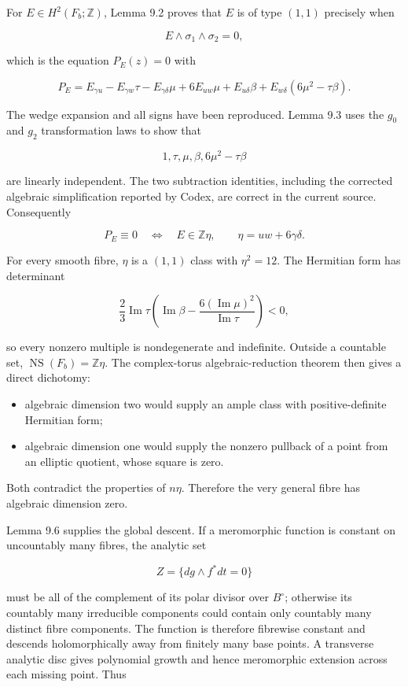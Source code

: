 \documentclass[
  10pt,
  letterpaper,
]{article}
\providecommand{\tightlist}{%
  \setlength{\itemsep}{0pt}\setlength{\parskip}{0pt}}
\begin{document}
For \(E\in H^2(F_b;\mathbb Z)\), Lemma 9.2 proves that \(E\) is of type
\((1,1)\) precisely when

\[
E\wedge\sigma_1\wedge\sigma_2=0,
\]

which is the equation \(P_E(z)=0\) with

\[
P_E=E_{\gamma u}-E_{\gamma w}\tau-E_{\gamma\delta}\mu
+6E_{uw}\mu+E_{u\delta}\beta+E_{w\delta}(6\mu^2-\tau\beta).
\]

The wedge expansion and all signs have been reproduced. Lemma 9.3 uses
the \(g_0\) and \(g_2\) transformation laws to show that

\[
1,\tau,\mu,\beta,6\mu^2-\tau\beta
\]

are linearly independent. The two subtraction identities, including the
corrected algebraic simplification reported by Codex, are correct in the
current source. Consequently

\[
P_E\equiv0
\quad\Longleftrightarrow\quad
E\in\mathbb Z\eta,
\qquad
\eta=uw+6\gamma\delta.
\]

For every smooth fibre, \(\eta\) is a \((1,1)\) class with
\(\eta^2=12\). The Hermitian form has determinant

\[
\frac23\operatorname{Im}\tau
\left(\operatorname{Im}\beta-\frac{6(\operatorname{Im}\mu)^2}{\operatorname{Im}\tau}\right)<0,
\]

so every nonzero multiple is nondegenerate and indefinite. Outside a
countable set, \(\operatorname{NS}(F_b)=\mathbb Z\eta\). The
complex-torus algebraic-reduction theorem then gives a direct dichotomy:

\begin{itemize}
\tightlist
\item
  algebraic dimension two would supply an ample class with
  positive-definite Hermitian form;
\item
  algebraic dimension one would supply the nonzero pullback of a point
  from an elliptic quotient, whose square is zero.
\end{itemize}

Both contradict the properties of \(n\eta\). Therefore the very general
fibre has algebraic dimension zero.

Lemma 9.6 supplies the global descent. If a meromorphic function is
constant on uncountably many fibres, the analytic set

\[
Z=\{dg\wedge f^*dt=0\}
\]

must be all of the complement of its polar divisor over \(B^\circ\);
otherwise its countably many irreducible components could contain only
countably many distinct fibre components. The function is therefore
fibrewise constant and descends holomorphically away from finitely many
base points. A transverse analytic disc gives polynomial growth and
hence meromorphic extension across each missing point. Thus
\end{document}
